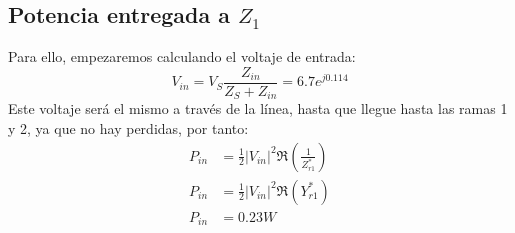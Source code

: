 \subsection{Potencia entregada a $Z_1$}
Para ello, empezaremos calculando el voltaje de entrada:
\[V_{in} = V_S \frac{Z_{in}}{Z_S + Z_{in} } = 6.7e^{j0.114}\]
Este voltaje será el mismo a través de la línea, hasta que llegue hasta las ramas 1 y 2, ya que no hay perdidas, por tanto:
\begin{align*}
  P_{in} &= \frac{1}{2} |V_{in} |^2 \Re (\frac{1}{Z_{r1}^*})\\
  P_{in} &= \frac{1}{2} |V_{in} |^2 \Re ({Y_{r1}^*}) \\
  P_{in} &= 0.23 W
\end{align*}
